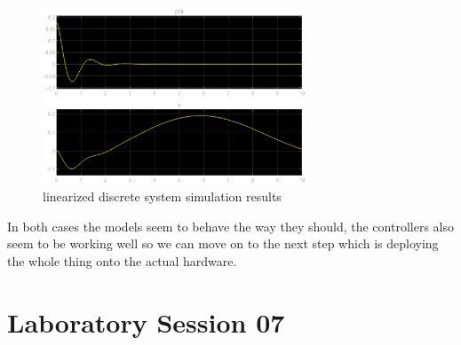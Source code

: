 \begin{figure}[H]
		\centering
		\includegraphics[width=0.7\textwidth]{figures/linear_balan_bot_disc_sim.eps}
		\caption{linearized discrete system simulation results}
		\label{fig:lin_disc_res}
\end{figure}

In both cases the models seem to behave the way they should, the controllers also seem to be working well so we can move on to the next step which is deploying the whole thing onto the actual hardware.


\part{Laboratory Session 07}


